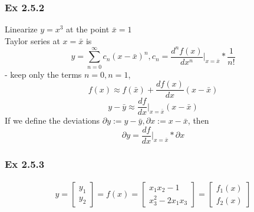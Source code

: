 \documentclass[letterpaper]{article}
\begin{document}
\subsubsection{Ex 2.5.2}
Linearize $y=x^3$ at the point $\bar x=1$\\
Taylor series at $x=\bar x$ is $$y=\sum_{n=0}^{\infty} c_n(x-\bar x)^n,c_n=\frac{d^nf(x)}{dx^n}\vert_{x=\bar x}* \frac{1}{n!}$$
- keep only the terms $n=0,n=1$, $$f(x)\approx f(\bar x)+\frac{df(x)}{dx}(x-\bar x)$$
$$y-\bar y\approx \frac{df}{dx}\vert_{x=\bar x}(x-\bar x)$$
If we define the deviations $\partial y:=y-\bar y, \partial x:=x-\bar x$, then $$\partial y=\frac{df}{dx}\vert_{x=\bar x}*\partial x$$ 

\subsubsection*{Ex 2.5.3}
\begin{align*}
  y=\begin{bmatrix} y_1 \\y_2\end{bmatrix}=f(x)=\begin{bmatrix}x_1x_2-1\\x_3^2-2x_1x_3\end{bmatrix}=\begin{bmatrix} f_1(x)\\f_2(x)\end{bmatrix}
\end{align*}
\end{document}
